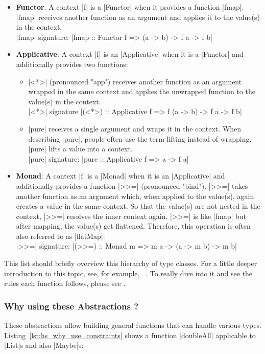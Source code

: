 \begin{itemize}
  \item \textbf{Functor}: A context |f| is a |Functor| when it provides a function
|fmap|. |fmap| receives another function as an argument and applies it to the
value(s) in the context.\\
|fmap| signature: |fmap :: Functor f => (a -> b) -> f a -> f b|\\

\item \textbf{Applicative}: A context |f| is an |Applicative| when it is a |Functor|
and additionally provides two functions:
\begin{itemize}
  \item |<*>| (pronounced "app") receives another function as an
    argument wrapped in the same context and applies the unwrapped function to
    the value(s) in the context. \\
    |<*>| signature |(<*>) :: Applicative f => f (a -> b) -> f a -> f b|
  \item |pure| receives a single argument and wraps it in the context. When
    describing |pure|, people often use the term lifting instead of wrapping.
    |pure| lifts a value into a context.\\
    |pure| signature: |pure :: Applicative f => a -> f a| \\
\end{itemize}
\item \textbf{Monad}: A context |f| is a |Monad| when it is an |Applicative| and
additionally provides a function |>>=| (pronounced "bind"). |>>=| takes another
function as an argument which, when applied to the value(s), again creates a
value in the same context. So that the value(s) are not nested in the context,
|>>=| resolves the inner context again. |>>=| is like |fmap| but after mapping,
the value(s) get flattened. Therefore, this operation is often also referred to
as |flatMap|.\\
|>>=| signature: |(>>=) :: Monad m => m a -> (a -> m b) -> m b|\\
\end{itemize}

This list should briefly overview this hierarchy of type classes. For a little
deeper introduction to this topic, see, for example, ~\cite{monads_adit_2013}.
To really dive into it and see the rules each function follows, please see
\cite[Chapter~12]{hutton_pih_2016}.

\subsubsection{Why using these Abstractions ?} %
\label{sec:Why using these Abstractions?}
These abstractions allow building general functions that can handle various
types. Listing~\ref{lst:hs_why_use_constraints} shows a function |doubleAll|
applicable to |List|s and also |Maybe|s:


